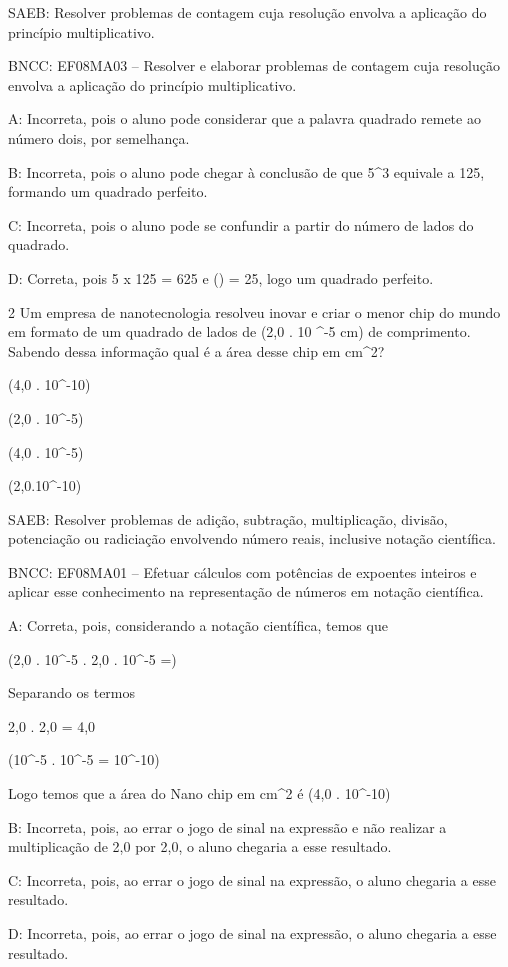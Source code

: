 {SAEB: Resolver problemas de contagem cuja resolução envolva a aplicação
do princípio multiplicativo.

BNCC: EF08MA03 -- Resolver e elaborar problemas de contagem cuja
resolução envolva a aplicação do princípio multiplicativo.

A: Incorreta, pois o aluno pode considerar que a palavra quadrado remete
ao número dois, por semelhança.

B: Incorreta, pois o aluno pode chegar à conclusão de que 5^3 equivale a
125, formando um quadrado perfeito.

C: Incorreta, pois o aluno pode se confundir a partir do número de lados
do quadrado.

D: Correta, pois 5 x 125 = 625 e () = 25, logo um quadrado
perfeito.

\num{2} Um empresa de nanotecnologia resolveu inovar e criar o menor chip do
mundo em formato de um quadrado de lados de (2,0 . 10 ^{-5 cm}) de
comprimento. Sabendo dessa informação qual é a área desse chip em cm^2?
\item (4,0 . 10^{-10})
\item (2,0 . 10^{-5})
\item (4,0 . 10^{-5})
\item (2,0.10^{-10})

SAEB: Resolver problemas de adição, subtração, multiplicação, divisão,
potenciação ou radiciação envolvendo número reais, inclusive notação
científica.

BNCC: EF08MA01 -- Efetuar cálculos com potências de expoentes inteiros e
aplicar esse conhecimento na representação de números em notação
científica.

A: Correta, pois, considerando a notação científica, temos que

(2,0 . 10^{-5} . 2,0 . 10^{-5} =)

Separando os termos

2,0 . 2,0 = 4,0

(10^{-5} . 10^{-5} = 10^{-10})

Logo temos que a área do Nano chip em cm^2 é (4,0 . 10^{-10})

B: Incorreta, pois, ao errar o jogo de sinal na expressão e não realizar
a multiplicação de 2,0 por 2,0, o aluno chegaria a esse resultado.

C: Incorreta, pois, ao errar o jogo de sinal na expressão, o aluno
chegaria a esse resultado.

D: Incorreta, pois, ao errar o jogo de sinal na expressão, o aluno
chegaria a esse resultado.

}
